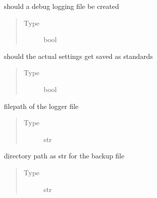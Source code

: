 \documentclass[letterpaper,10pt,english]{sphinxmanual}
\begin{document}
\begin{fulllineitems}
\begin{fulllineitems}
\label{\detokenize{chatwolf:chatwolf.game.Game.do_debug}}
should a debug logging file be created
\begin{quote}\begin{description}
\item[{Type}] \leavevmode
bool

\end{description}\end{quote}

\end{fulllineitems}


\begin{fulllineitems}
\label{\detokenize{chatwolf:chatwolf.game.Game.do_save_conf}}
should the actual settings get saved as standards
\begin{quote}\begin{description}
\item[{Type}] \leavevmode
bool

\end{description}\end{quote}

\end{fulllineitems}


\begin{fulllineitems}
\label{\detokenize{chatwolf:chatwolf.game.Game.logfilename}}
filepath of the logger file
\begin{quote}\begin{description}
\item[{Type}] \leavevmode
str

\end{description}\end{quote}

\end{fulllineitems}


\begin{fulllineitems}
\label{\detokenize{chatwolf:chatwolf.game.Game.bkp_dir}}
directory path as str for the backup file
\begin{quote}\begin{description}
\item[{Type}] \leavevmode
str


\end{description}
\end{quote}
\end{fulllineitems}
\end{fulllineitems}
\end{document}
